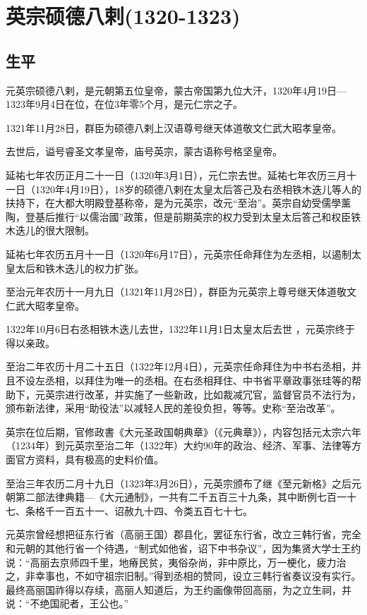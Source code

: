 
\section{英宗硕德八剌\tiny(1320-1323)}

\subsection{生平}

元英宗硕德八剌，是元朝第五位皇帝，蒙古帝国第九位大汗，1320年4月19日—1323年9月4日在位，在位3年零5个月，是元仁宗之子。

1321年11月28日，群臣为硕德八剌上汉语尊号继天体道敬文仁武大昭孝皇帝。

去世后，谥号睿圣文孝皇帝，庙号英宗，蒙古语称号格坚皇帝。

延祐七年农历正月二十一日（1320年3月1日），元仁宗去世。延祐七年农历三月十一日（1320年4月19日），18岁的硕德八剌在太皇太后答己及右丞相铁木迭儿等人的扶持下，在大都大明殿登基称帝，是为元英宗，改元“至治”。英宗自幼受儒學薰陶，登基后推行“以儒治國”政策，但是前期英宗的权力受到太皇太后答己和权臣铁木迭儿的很大限制。

延祐七年农历五月十一日（1320年6月17日），元英宗任命拜住为左丞相，以遏制太皇太后和铁木迭儿的权力扩张。

至治元年农历十一月九日（1321年11月28日），群臣为元英宗上尊号继天体道敬文仁武大昭孝皇帝。

1322年10月6日右丞相铁木迭儿去世，1322年11月1日太皇太后去世 ，元英宗终于得以亲政。

至治二年农历十月二十五日（1322年12月4日），元英宗任命拜住为中书右丞相，并且不设左丞相，以拜住为唯一的丞相。在右丞相拜住、中书省平章政事张珪等的帮助下，元英宗进行改革，并实施了一些新政，比如裁减冗官，监督官员不法行为，颁布新法律，采用“助役法”以减轻人民的差役负担，等等。史称“至治改革”。

英宗在位后期，官修政書《大元圣政国朝典章》（《元典章》），内容包括元太宗六年（1234年）到元英宗至治二年（1322年）大约90年的政治、经济、军事、法律等方面官方资料，具有极高的史料价值。

至治三年农历二月十九日（1323年3月26日），元英宗颁布了继《至元新格》之后元朝第二部法律典籍—《大元通制》，一共有二千五百三十九条，其中断例七百一十七、条格千一百五十一、诏赦九十四、令类五百七十七。

元英宗曾经想把征东行省（高丽王国）郡县化，罢征东行省，改立三韩行省，完全和元朝的其他行省一个待遇，“制式如他省，诏下中书杂议”，因为集贤大学士王约说：“高丽去京师四千里，地瘠民贫，夷俗杂尚，非中原比，万一梗化，疲力治之，非幸事也，不如守祖宗旧制。”得到丞相的赞同，设立三韩行省奏议没有实行。最终高丽国祚得以存续，高丽人知道后，为王约画像带回高丽，为之立生祠，并说：“不绝国祀者，王公也。”

